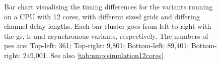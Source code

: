 \begin{figure}
    \caption[Bar chart visualising the timing differences for the variants on a 12-core CPU]{Bar chart visualising the timing differences for the variants running on a CPU with 12 cores, with different sized grids and differing channel delay lengths.  Each bar cluster goes from left to right with the \gls{gs}, \gls{ls} and asynchronous variants, respectively.  The numbers of \glspl{pe} are:  Top-left: 361;  Top-right:  9,801;  Bottom-left:  89,401;  Bottom-right:  249,001.  See also \cref{tab:nmp:simulation12cores}}
    \label{fig:nmp:timings12cores}
\end{figure}

